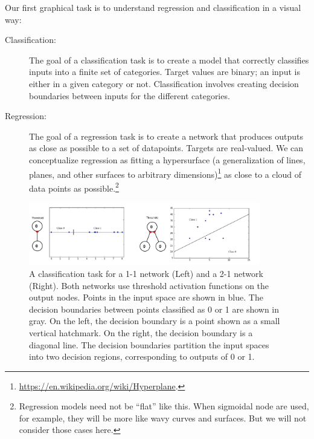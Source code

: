 Our first graphical task is to understand regression and classification in a visual way:
\begin{description}
\item[Classification:] The goal of a classification task is to create a model that correctly classifies inputs into a finite set of categories. Target values are binary; an input is either in a given category or not. Classification involves creating decision boundaries between inputs for the different categories. 
\item[Regression:] The goal of a regression task is to create a network that produces outputs as close as possible to a set of datapoints. Targets are real-valued. We can conceptualize regression as fitting a hypersurface (a generalization of lines, planes, and other surfaces to arbitrary dimensions)\footnote{\url{https://en.wikipedia.org/wiki/Hyperplane}.} as close to a cloud of data points as possible.\footnote{Regression models need not be ``flat'' like this. When sigmoidal node are used, for example, they will be more like wavy curves and surfaces. But we will not consider those cases here.}
\end{description}

\begin{figure}[h]
\centering
\includegraphics[width=0.9\textwidth]{images/visualizeClassification.png}
\caption[Jeff Yoshimi.]{A classification task for a 1-1 network (Left) and a 2-1 network (Right). Both networks use threshold activation functions on the output nodes. Points in the input space are shown in  blue. The decision boundaries between points classified as 0 or 1 are shown in gray. On the left, the decision boundary is a point shown as a small vertical hatchmark. On the right, the decision boundary is a diagonal line. The decision boundaries partition the input spaces into two decision regions, corresponding to outputs of 0 or 1.}
\label{visualize_classification}
\end{figure}

